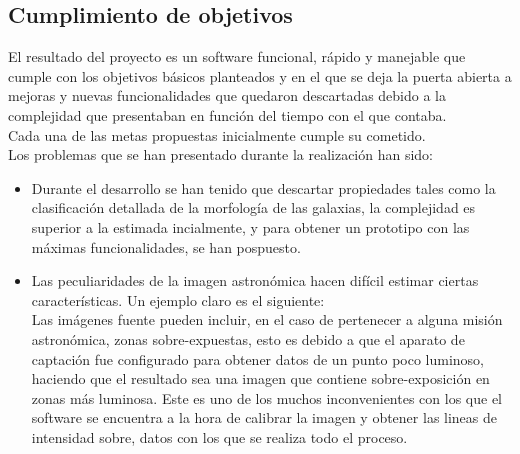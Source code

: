 	\subsection{Cumplimiento de objetivos}
	El resultado del proyecto es un software funcional, rápido y manejable que cumple con los objetivos básicos planteados y en el que se deja la puerta abierta a mejoras y nuevas funcionalidades que quedaron descartadas debido a la complejidad que presentaban en función del tiempo con el que contaba.
	\\Cada una de las metas propuestas inicialmente cumple su cometido.\\
	Los problemas que se han presentado durante la realización han sido:\\
	\begin{itemize}
		\item Durante el desarrollo se han tenido que descartar propiedades tales como la clasificación detallada de la morfología de las galaxias, la complejidad es superior a la estimada incialmente, y para obtener un prototipo con las máximas funcionalidades, se han pospuesto.
		\item Las peculiaridades de la imagen astronómica hacen difícil estimar ciertas características. Un ejemplo claro es el siguiente:\\
			Las imágenes fuente pueden incluir, en el caso de pertenecer a alguna misión astronómica, zonas sobre-expuestas, esto es debido a que el aparato de captación fue configurado para obtener datos de un punto poco luminoso, haciendo que el resultado sea una imagen que contiene sobre-exposición en zonas más luminosa. Este es uno de los muchos inconvenientes con los que el software se encuentra a la hora de calibrar la imagen y obtener las lineas de intensidad sobre, datos con los que se realiza todo el proceso.
	\end{itemize}
